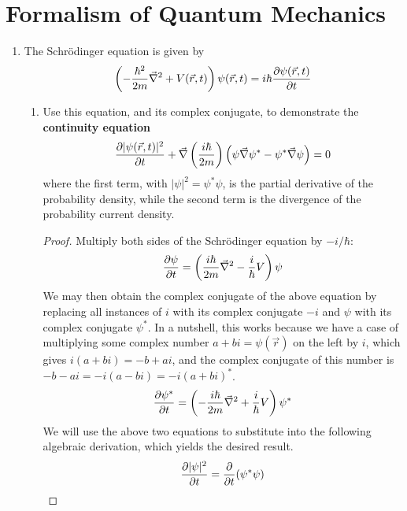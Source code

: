 \documentclass[../psets.tex]{subfiles}
\begin{document}
\section{Formalism of Quantum Mechanics}
\begin{enumerate}
    \item {}The Schr\"{o}dinger equation is given by
    \begin{equation*}
        \left( -\frac{\hbar^2}{2m}\vec{\nabla}^2+V(\vec{r},t) \right)\psi(\vec{r},t) = i\hbar\pdv{\psi(\vec{r},t)}{t}
    \end{equation*}
    \begin{enumerate}
        \item Use this equation, and its complex conjugate, to demonstrate the \textbf{continuity equation}
        \begin{equation*}
            \pdv{|\psi(\vec{r},t)|^2}{t}+\vec{\nabla}\left( \frac{i\hbar}{2m} \right)\left( \psi\vec{\nabla}\psi^*-\psi^*\vec{\nabla}\psi \right) = 0
        \end{equation*}
        where the first term, with $|\psi|^2=\psi^*\psi$, is the partial derivative of the probability density, while the second term is the divergence of the probability current density.
        \begin{proof}
            Multiply both sides of the Schr\"{o}dinger equation by $-i/\hbar$:
            \begin{equation*}
                \pdv{\psi}{t} = \left( \frac{i\hbar}{2m}\vec{\nabla}^2-\frac{i}{\hbar}V \right)\psi
            \end{equation*}
            We may then obtain the complex conjugate of the above equation by replacing all instances of $i$ with its complex conjugate $-i$ and $\psi$ with its complex conjugate $\psi^*$. In a nutshell, this works because we have a case of multiplying some complex number $a+bi=\psi(\vec{r})$ on the left by $i$, which gives $i(a+bi)=-b+ai$, and the complex conjugate of this number is $-b-ai=-i(a-bi)=-i(a+bi)^*$.
            \begin{equation*}
                \pdv{\psi^*}{t} = \left( -\frac{i\hbar}{2m}\vec{\nabla}^2+\frac{i}{\hbar}V \right)\psi^*
            \end{equation*}
            We will use the above two equations to substitute into the following algebraic derivation, which yields the desired result.
            \begin{align*}
                \pdv{|\psi|^2}{t} &= \pdv{t}(\psi^*\psi)\\

\end{align*}
\end{proof}
\end{enumerate}
\end{enumerate}
\end{document}

